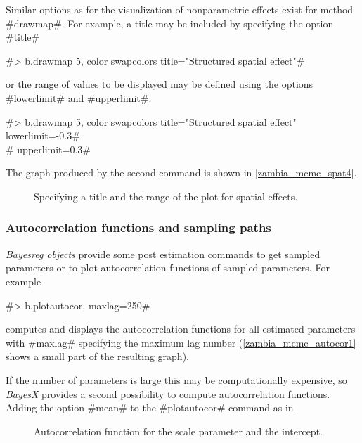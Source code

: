 Similar options as for the visualization of nonparametric effects
exist for method #drawmap#. For example, a title may be included
by specifying the option #title#

#> b.drawmap 5, color swapcolors title="Structured spatial effect"#

or the range of values to be displayed may be defined using the
options #lowerlimit# and #upperlimit#:

#> b.drawmap 5, color swapcolors title="Structured spatial effect" lowerlimit=-0.3#\\
#  upperlimit=0.3#

The graph produced by the second command is shown in
\autoref{zambia_mcmc_spat4}.

\begin{figure}[ht]
\begin{center}
{\it\caption{Specifying a title and the range of the plot for
spatial effects.\label{zambia_mcmc_spat4}}}
\end{center}
\end{figure}

\subsubsection{Autocorrelation functions and sampling
paths}\label{zambia_mcmc_postest}

{\em Bayesreg objects} provide some post estimation commands to
get sampled parameters or to plot autocorrelation functions of
sampled parameters. For example

#> b.plotautocor, maxlag=250#

computes and displays the autocorrelation functions for all
estimated parameters with #maxlag# specifying the maximum lag
number (\autoref{zambia_mcmc_autocor1} shows a small part of the
resulting graph).

If the number of parameters is large this may be computationally
expensive, so {\it BayesX} provides a second possibility to
compute autocorrelation functions. Adding the option #mean# to the
#plotautocor# command as in

\begin{figure}[ht]
\begin{center}
{\it\caption{Autocorrelation function for the scale parameter and
the intercept.\label{zambia_mcmc_autocor1}}}
\end{center}
\end{figure}


